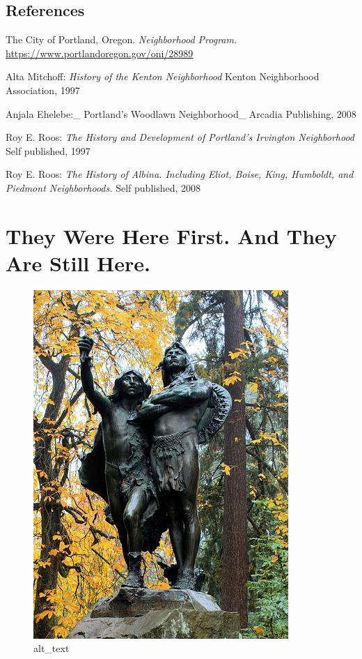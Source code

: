 \documentclass[
  12pt,
]{book}
\begin{document}
\hypertarget{references}{%
\section{References}\label{references}}

The City of Portland, Oregon. \emph{Neighborhood Program.}
\url{https://www.portlandoregon.gov/oni/28989}

Alta Mitchoff: \emph{History of the Kenton Neighborhood}
Kenton Neighborhood Association, 1997

Anjala Ehelebe:\_ Portland's Woodlawn Neighborhood\_
Arcadia Publishing, 2008

Roy E. Roos: \emph{The History and Development of Portland's Irvington Neighborhood}
Self published, 1997

Roy E. Roos: \emph{The History of Albina. Including Eliot, Boise, King, Humboldt, and Piedmont Neighborhoods.}
Self published, 2008

\hypertarget{they-were-here-first.-and-they-are-still-here.}{%
\chapter{They Were Here First. And They Are Still Here.}\label{they-were-here-first.-and-they-are-still-here.}}

\begin{figure}
\centering
\includegraphics{images/01_images/image1.jpg}
\caption{alt\_text}
\end{figure}
\end{document}
